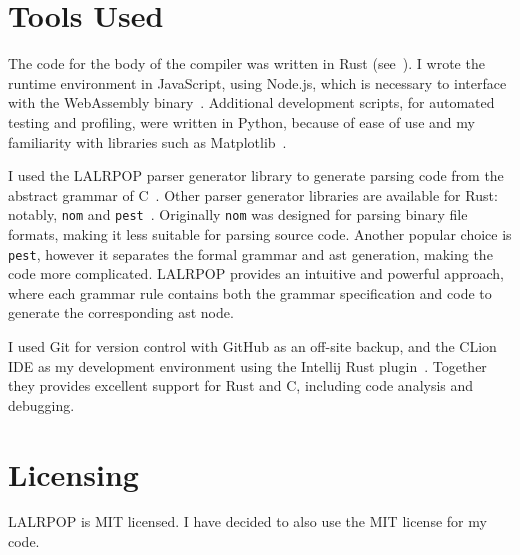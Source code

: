 \documentclass[00-main.tex]{subfiles}
\begin{document}
\section{Tools Used}

The code for the body of the compiler was written in Rust (see~).
I wrote the runtime environment in JavaScript, using Node.js, which is necessary to interface with the Web\-Assembly binary~.
Additional development scripts, for automated testing and profiling, were written in Python, because of ease of use and my familiarity with libraries such as Matplotlib~.

I used the LALRPOP parser generator library to generate parsing code from the abstract grammar of C~.
Other parser generator libraries are available for Rust: notably, \texttt{nom} and \texttt{pest}~.
Originally \texttt{nom} was designed for parsing binary file formats, making it less suitable for parsing source code.
Another popular choice is \texttt{pest}, however it separates the formal grammar and \gls{ast} generation, making the code more complicated.
LALRPOP provides an intuitive and powerful approach, where each grammar rule contains both the grammar specification and code to generate the corresponding \gls{ast} node.

I used Git for version control with GitHub as an off-site backup, and the CLion IDE as my development environment using the Intellij Rust plugin~.
Together they provides excellent support for Rust and C, including code analysis and debugging.


\section{Licensing}

LALRPOP is MIT licensed.
I have decided to also use the MIT license for my code.
\end{document}
